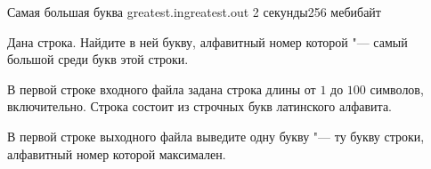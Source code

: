 \begin{problem}{Самая большая буква}
{greatest.in}{greatest.out}
{2 секунды}{256 мебибайт}{}

Дана строка. Найдите в ней букву, алфавитный номер которой "--- самый большой
среди букв этой строки.

\InputFile

В первой строке входного файла задана строка длины от $1$ до $100$ символов,
включительно. Строка состоит из строчных букв латинского алфавита.

\OutputFile

В первой строке выходного файла выведите одну букву "--- ту букву строки,
алфавитный номер которой максимален.

\Examples

\begin{example}
%
%
\end{example}

\end{problem}
